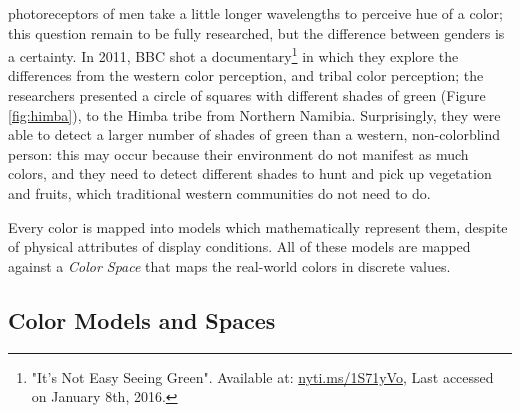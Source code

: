 photoreceptors of men take a little longer wavelengths to perceive hue of a color; this question remain
to be fully researched, but the difference between genders is a certainty. In 2011, BBC shot a
documentary\footnote{\label{itsnoteasy}"It's Not Easy Seeing Green". Available at:
{\url {nyti.ms/1S71yVo}},
Last accessed on January 8th, 2016.} in which they explore the differences from the western color
perception, and tribal color perception; the researchers presented a circle of squares with different
shades of green (Figure \ref{fig:himba}), to the Himba tribe from Northern Namibia. Surprisingly, they were able to detect a larger
number of shades of green than a western, non-colorblind person: this may occur because their environment do not
manifest as much colors, and they need to detect different shades to hunt and pick up vegetation and
fruits, which traditional western communities do not need to do. \\
\par
Every color is mapped into models which mathematically represent them, despite of physical attributes of display conditions.
All of these models are mapped against a \emph{Color Space} that maps the real-world colors in discrete values.
%
%
\subsection{Color Models and Spaces}
\label{subsec:colormodelspaces}
%
